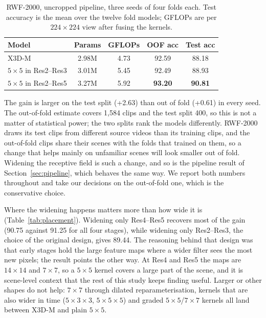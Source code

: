 \documentclass[conference]{IEEEtran}
\begin{document}
\begin{table}[t]
  \centering
  \caption{RWF-2000, uncropped pipeline, three seeds of four folds each.
  Test accuracy is the mean over the twelve fold models; GFLOPs are per
  $224\times224$ view after fusing the kernels.}
  \label{tab:kernels}
  \setlength{\tabcolsep}{3.5pt}
  \begin{tabular}{lcccc}
    \toprule
    Model & Params & GFLOPs & OOF acc & Test acc \\
    \midrule
    X3D-M                        & 2.98M & 4.73 & 92.59 & 88.18 \\
    \;$5\times5$ in Res2--Res3   & 3.01M & 5.45 & 92.49 & 88.93 \\
    \;$5\times5$ in Res2--Res5   & 3.27M & 5.92 & \textbf{93.20} & \textbf{90.81} \\
    \bottomrule
  \end{tabular}
\end{table}

The gain is larger on the test split (+2.63) than out of fold (+0.61) in
every seed. The out-of-fold estimate covers 1{,}584 clips and the test
split 400, so this is not a matter of statistical power; the two splits
rank the models differently. RWF-2000 draws its test clips from different
source videos than its training clips, and the out-of-fold clips share
their scenes with the folds that trained on them, so a change that helps
mainly on unfamiliar scenes will look smaller out of fold. Widening the
receptive field is such a change, and so is the pipeline result of
Section~\ref{sec:pipeline}, which behaves the same way. We report both
numbers throughout and take our decisions on the out-of-fold one, which is
the conservative choice.

Where the widening happens matters more than how wide it is
(Table~\ref{tab:placement}). Widening only Res4--Res5 recovers most of the
gain (90.75 against 91.25 for all four stages), while widening only
Res2--Res3, the choice of the original design, gives 89.44. The reasoning
behind that design was that early stages hold the large feature maps where
a wider filter sees the most new pixels; the result points the other way.
At Res4 and Res5 the maps are $14\times14$ and $7\times7$, so a $5\times5$
kernel covers a large part of the scene, and it is scene-level context that
the rest of this study keeps finding useful. Larger or other shapes do not
help: $7\times7$ through dilated reparameterisation, kernels that are also
wider in time ($5\times3\times3$, $5\times5\times5$) and graded
$5\times5$/$7\times7$ kernels all land between X3D-M and plain $5\times5$.
\end{document}

